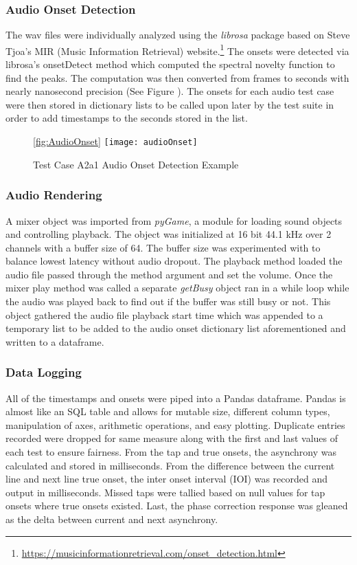 \subsubsection{Audio Onset Detection}
The wav files were individually analyzed using the \textit{librosa} package based on Steve Tjoa's MIR (Music Information Retrieval) website.\footnote{\url{https://musicinformationretrieval.com/onset_detection.html}}
The onsets were detected via librosa's onsetDetect method which computed the spectral novelty function to find the peaks. The computation was then converted from frames to seconds with nearly nanosecond precision (See Figure \label{fig:AudioOnset}). The onsets for each audio test case were then stored in dictionary lists to be called upon later by the test suite in order to add timestamps to the seconds stored in the list.
\begin{figure}[H]\ref{fig:AudioOnset}
    \centering
    \texttt{[image: audioOnset]}
    \caption{Test Case A2a1 Audio Onset Detection Example}
\end{figure}
\subsubsection{Audio Rendering}
A mixer object was imported from \textit{pyGame}, a module for loading sound objects and controlling playback. The object was initialized at 16 bit 44.1 kHz over 2 channels with a buffer size of 64. The buffer size was experimented with to balance lowest latency without audio dropout. The playback method loaded the audio file passed through the method argument and set the volume. Once the mixer play method was called a separate \textit{getBusy} object ran in a while loop while the audio was played back to find out if the buffer was still busy or not. This object gathered the audio file playback start time which was appended to a temporary list to be added to the audio onset dictionary list aforementioned and written to a dataframe.
\subsubsection{Data Logging}
All of the timestamps and onsets were piped into a Pandas dataframe. Pandas is almost like an SQL table and allows for mutable size, different column types, manipulation of axes, arithmetic operations, and easy plotting. Duplicate entries recorded were dropped for same measure along with the first and last values of each test to ensure fairness. From the tap and true onsets, the asynchrony was calculated and stored in milliseconds. From the difference between the current line and next line true onset, the inter onset interval (IOI) was recorded and output in milliseconds. Missed taps were tallied based on null values for tap onsets where true onsets existed. Last, the phase correction response was gleaned as the delta between current and next asynchrony.
